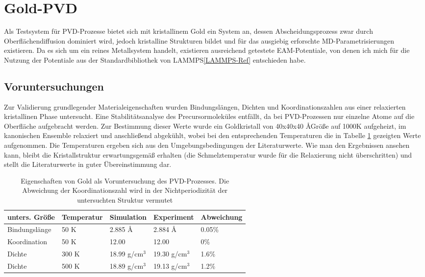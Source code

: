 \section{Gold-PVD}

Als Testsystem für PVD-Prozesse bietet sich mit kristallinem Gold ein System an, dessen Abscheidungsprozess zwar durch Oberflächendiffusion dominiert wird, jedoch kristalline Strukturen bildet und für das ausgiebig erforschte MD-Parametrisierungen existieren.
Da es sich um ein reines Metallsystem handelt, existieren ausreichend getestete EAM-Potentiale, von denen ich mich für die Nutzung der Potentiale aus der Standardbibliothek von LAMMPS\ref{LAMMPS-Ref} entschieden habe.

\subsection{Voruntersuchungen}

Zur Validierung grundlegender Materialeigenschaften wurden Bindungslängen, Dichten und Koordinationszahlen aus einer relaxierten kristallinen Phase untersucht.
Eine Stabilitätsanalyse des Precursormoleküles entfällt, da bei PVD-Prozessen nur einzelne Atome auf die Oberfläche aufgebracht werden.
Zur Bestimmung dieser Werte wurde ein Goldkristall von 40x40x40 \AA Größe auf 1000K aufgeheizt, im kanonischen Ensemble relaxiert und anschließend abgekühlt, wobei bei den entsprechenden Temperaturen die in Tabelle \ref{tab:goldpreresults} gezeigten Werte aufgenommen.
Die Temperaturen ergeben sich aus den Umgebungsbedingungen der Literaturwerte.
Wie man den Ergebnissen ansehen kann, bleibt die Kristallstruktur erwartungsgemäß erhalten (die Schmelztemperatur wurde für die Relaxierung nicht überschritten) und stellt die Literaturwerte in guter Übereinstimmung dar.

\begin{table}[hbtp]
  \caption[Eigenschaften von Gold]{Eigenschaften von Gold als Voruntersuchung des PVD-Prozesses. Die Abweichung der Koordinationszahl wird in der Nichtperiodizität der untersuchten Struktur vermutet}
  \label{tab:goldpreresults}
  \begin{tabularx}{\textwidth}{|lXXXX|}
    \hline
    \textbf{unters. Größe} & \textbf{Temperatur} & \textbf{Simulation} & \textbf{Experiment} & \textbf{Abweichung}\\
    \hline
    Bindungslänge & 50 K & 2.885 \AA & 2.884 \AA & 0.05\% \\
    Koordination & 50 K & 12.00 & 12.00 & 0\% \\
    Dichte & 300 K & 18.99 g/cm$^3$ & 19.30 g/cm$^3$ & 1.6\%\\
    Dichte & 500 K & 18.89 g/cm$^3$ & 19.13 g/cm$^3$ & 1.2\%\\
    \hline
  \end{tabularx}
\end{table}

